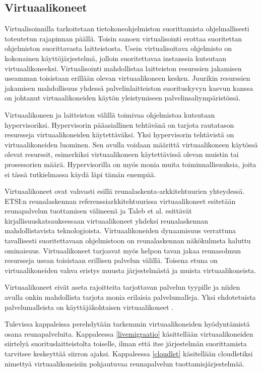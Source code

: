 \subsection{Virtuaalikoneet}

Virtualisoinnilla tarkoitetaan tietokoneohjelmiston suorittamista ohjelmallisesti toteutetun rajapinnan päällä. 
Toisin sanoen virtualisointi erottaa suoritettan ohjelmiston suorittavasta laitteistosta.
Usein virtualisoitava ohjelmisto on kokonainen käyttöjärjestelmä, jolloin suoritettavaa instanssia kutsutaan virtuaalikoneeksi. 
Virtualisointi mahdollistaa laitteiston resurssien jakamisen useamman toisistaan erillään olevan virtuaalikoneen kesken.
Juurikin resurssien jakamisen mahdollisuus yhdessä palvelinlaitteiston suorituskyvyn kasvun kanssa on johtanut virtuaalikoneiden käytön yleistymiseen palvelinsaliympäristössä.

Virtuaalikoneen ja laitteiston välillä toimivaa ohjelmistoa kutsutaan hypervisoriksi. Hypervisorin pääasiallinen tehtävänä on tarjota rautatason resursseja virtuaalikoneiden käytettäväksi. 
Yksi hypervisorin tehtävistä on virtuaalikoneiden luominen. Sen avulla voidaan määrittä virtuaalikoneen käytössä olevat resurssit, esimerkiksi virtuaalikoneen käytettävissä olevan muistin tai prosessorien määrä. Hypervisorilla on myös monia muita toiminnallisuuksia, joita ei tässä tutkielmassa käydä läpi tämän enempää. 

Virtuaalikoneet ovat vahvasti esillä reunalaskenta-arkkitehtuurien yhteydessä. 
ETSI:n reunalaskennan referenssiarkkitehtuurissa \cite{etsirefarch} virtuaalikoneet esitetään reunapalvelun tuottamisen välineenä ja Taleb et al. \cite{taleb2017multi} esittävät kirjallisuuskatsauksessaan virtuaalikoneet yhdeksi reunalaskennan mahdollistavista teknologioista.
Virtuaalikoneiden dynaamisuus verrattuna tavallisesti suoritettavaan ohjelmistoon on reunalaskennan näkökulmsta haluttu ominaisuus. 
Virtuaalikoneet tarjoavat myös helpon tavan jakaa reunasolmun resursseja usean toisistaan erillisen palvelun välillä.
Toisena etuna on virtuaalikoneiden vahva eristys muusta järjestelmästä ja muista virtuaalikoneista.

Virtuaalikoneet eivät aseta rajoitteita tarjottavan palvelun tyypille ja niiden avulla onkin mahdollista tarjota monia erilaisia palvelumalleja.
Yksi ehdotetuista palvelumalleista on käyttäjäkohtaisen virtuaalikoneet \cite{satya09,wang2015mobiscud}. 

Tulevissa kappaleissa perehdytään tarkemmin virtuaalikoneiden hyödyntämistä osana reunapalveluita.
Kappaleessa \ref{livemigraatio} käsittellään virtuaalikoneiden siirtelyä suorituslaitteistolta toiselle, ilman että itse järjestelmän suorittamista tarvitsee keskeyttää siirron ajaksi. 
Kappaleessa \ref{cloudlet} käsitellään cloudletiksi nimettyä  virtuaalikoneisiin pohjautuvaa reunapalvelun tuottamisjärjestelmää.

